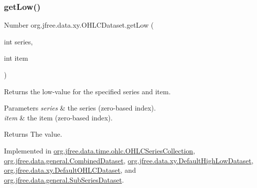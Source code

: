 \mbox{\label{interfaceorg_1_1jfree_1_1data_1_1xy_1_1_o_h_l_c_dataset_a87d7730829e66f23a2601c3519cf828a}} 
\subsubsection{\texorpdfstring{get\+Low()}{getLow()}}
{\footnotesize\ttfamily Number org.\+jfree.\+data.\+xy.\+O\+H\+L\+C\+Dataset.\+get\+Low (\begin{DoxyParamCaption}\item[{int}]{series,  }\item[{int}]{item }\end{DoxyParamCaption})}

Returns the low-\/value for the specified series and item.


\begin{DoxyParams}{Parameters}
{\em series} & the series (zero-\/based index). \\
\hline
{\em item} & the item (zero-\/based index).\\
\hline
\end{DoxyParams}
\begin{DoxyReturn}{Returns}
The value. 
\end{DoxyReturn}


Implemented in \mbox{\hyperlink{classorg_1_1jfree_1_1data_1_1time_1_1ohlc_1_1_o_h_l_c_series_collection_a94216d1171b19bc6b3268f570a2c9457}{org.\+jfree.\+data.\+time.\+ohlc.\+O\+H\+L\+C\+Series\+Collection}}, \mbox{\hyperlink{classorg_1_1jfree_1_1data_1_1general_1_1_combined_dataset_a2efcaba52f70e4982cc7872fcf447bfb}{org.\+jfree.\+data.\+general.\+Combined\+Dataset}}, \mbox{\hyperlink{classorg_1_1jfree_1_1data_1_1xy_1_1_default_high_low_dataset_a01dec545835846178a9731df03bbc435}{org.\+jfree.\+data.\+xy.\+Default\+High\+Low\+Dataset}}, \mbox{\hyperlink{classorg_1_1jfree_1_1data_1_1xy_1_1_default_o_h_l_c_dataset_a6613a90e1ad1a6ecfdee32baa3097a14}{org.\+jfree.\+data.\+xy.\+Default\+O\+H\+L\+C\+Dataset}}, and \mbox{\hyperlink{classorg_1_1jfree_1_1data_1_1general_1_1_sub_series_dataset_a317d15536060c58dbe89de699b605fc6}{org.\+jfree.\+data.\+general.\+Sub\+Series\+Dataset}}.

\mbox{\label{interfaceorg_1_1jfree_1_1data_1_1xy_1_1_o_h_l_c_dataset_a19a2a153a113ed4f82eedd596e94d1ed}} 
